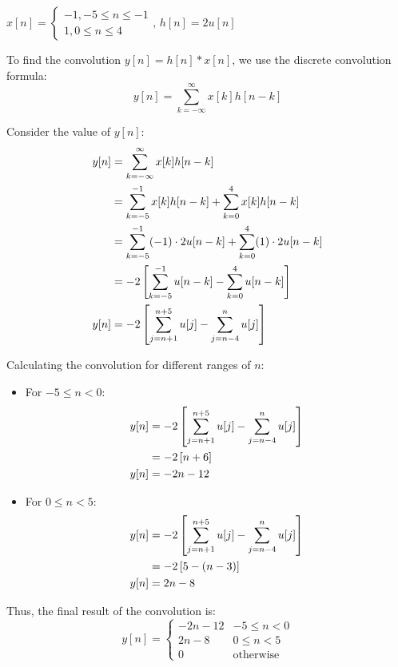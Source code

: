 \documentclass[a4paper, 10pt]{article}
\begin{document}
\begin{tosubmit}
\begin{subproblems}[start=1]
    \item \( x[n] = \begin{cases} -1 , -5 \leq n \leq -1 \\ 1 , 0 \leq n \leq 4 \end{cases},\, h[n] = 2u[n] \)
\end{subproblems}

\par\noindent\submitsolution
To find the convolution \( y[n] = h[n] * x[n] \), we use the discrete convolution formula:
\[ y[n] = \sum_{k=-\infty}^{\infty} x[k] h[n - k] \]

Consider the value of \( y[n] \):
\begin{align*}
    y[n] &= \sum_{k=-\infty}^{\infty} x[k] h[n - k] \\
    &= \sum_{k=-5}^{-1} x[k] h[n - k] + \sum_{k=0}^{4} x[k] h[n - k] \\
    &= \sum_{k=-5}^{-1} (-1) \cdot 2u[n - k] + \sum_{k=0}^{4} (1) \cdot 2u[n - k] \\
    &= -2 \left[ \sum_{k=-5}^{-1} u[n - k] - \sum_{k=0}^{4} u[n - k] \right] \\
    y[n] &= -2 \left[ \sum_{j=n+1}^{n+5} u[j] - \sum_{j=n-4}^{n} u[j] \right] \\
\end{align*}

Calculating the convolution for different ranges of \( n \):
\begin{itemize}
    \item For \( -5 \leq n < 0 \):
    \begin{align*}
        y[n] &= -2 \left[ \sum_{j=n+1}^{n+5} u[j] - \sum_{j=n-4}^{n} u[j] \right] \\
        &= -2 \left[ n + 6  \right] \\
        y[n] &= -2n - 12
    \end{align*}
    \item For \( 0 \leq n < 5 \):
    \begin{align*}
        y[n] &= -2 \left[ \sum_{j=n+1}^{n+5} u[j] - \sum_{j=n-4}^{n} u[j] \right] \\
        &= -2 \left[ 5 - (n - 3) \right] \\
        y[n] &= 2n - 8
    \end{align*}
\end{itemize}

Thus, the final result of the convolution is:
\[ \boxed{
y[n] = \begin{cases}
-2n - 12 & -5 \leq n < 0 \\
2n - 8 & 0 \leq n < 5 \\
0 & \text{otherwise}
\end{cases}
} \]
\end{tosubmit}
\end{document}
